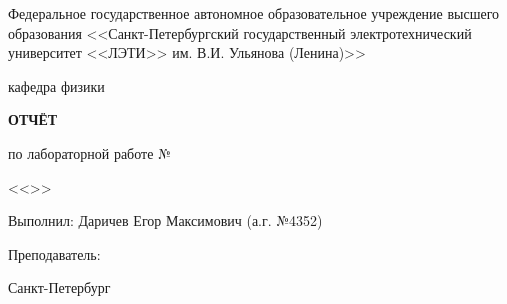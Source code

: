 \begin{titlepage}
    {
    \begin{center}
        Федеральное государственное автономное образовательное учреждение высшего
        образования <<Санкт-Петербургский государственный электротехнический
        университет <<ЛЭТИ>> им. В.И. Ульянова (Ленина)>>
        
        кафедра физики

        \bfseries
        \vspace{0.15\textheight}
        ОТЧЁТ\par
        по лабораторной работе №\labnum\par
        <<\labtitle>>\par
        \vspace{0.15\textheight}
    \end{center}

    Выполнил: Даричев Егор Максимович (а.г. №4352) \par
    Преподаватель: \tteacher
    \vspace{\fill}
    \begin{center}
        Санкт-Петербург\par
        \yyear
    \end{center}
    }
\end{titlepage}